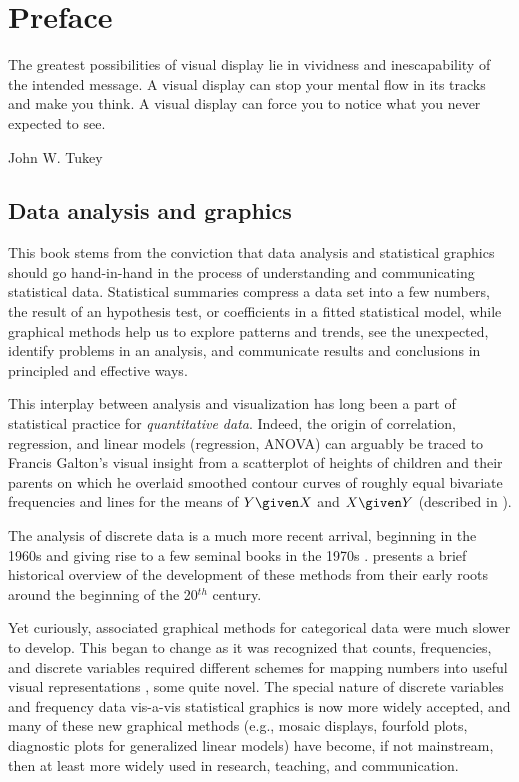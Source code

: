 \chapter*{Preface}


\epigraph{The greatest possibilities of visual display lie in vividness and inescapability of the intended message.
A visual display can stop your mental flow in its tracks and make you think.
A visual display can force you to notice what you never expected to see.}{John W. Tukey \citeyearpar{Tukey:90}}



\section*{Data analysis and graphics}

This book stems from the conviction that data analysis and statistical graphics should
go hand-in-hand in the process of understanding and communicating statistical data.
Statistical summaries compress a data set into a few numbers, the result of an
hypothesis test, or coefficients in a fitted statistical model,
while graphical methods help us to explore patterns and trends, see the unexpected,
identify problems in an analysis, and communicate results and conclusions in 
principled and effective ways. 

This interplay between analysis and visualization has long been a part of 
statistical practice for \emph{quantitative data}.  Indeed, the origin
of correlation, regression, and linear models (regression, ANOVA) can
arguably be traced to Francis Galton's \citeyearpar{Galton:1886}
visual insight from a scatterplot of heights of children and their parents
on which he overlaid smoothed contour curves of roughly equal bivariate frequencies
and lines for the means of $Y \given X$ and $X \given Y$
(described in \citet{FriendlyDenis:05:scat,Friendly-etal:ellipses:2013}).

The analysis of discrete data is a much more recent arrival, beginning in the
1960s and giving rise to a few seminal books in the 1970s
\citep{Bishop-etal:75,Haberman:74, Goodman:1978,Fienberg:80}.
\citet[]{Agresti:2013} presents a brief historical overview of the
development of these methods from their early roots around the beginning
of the 20$^{th}$ century.

Yet curiously, associated graphical methods for categorical data were 
much slower to develop. This began to change as it was recognized that
counts, frequencies, and discrete variables required different
schemes for mapping numbers into useful visual representations \citep{Friendly:95,Friendly:97},
some quite novel.
The special nature of discrete variables
and frequency data vis-a-vis statistical graphics is now more widely accepted,
and many of these new graphical methods (e.g., mosaic displays, fourfold plots, diagnostic
plots for generalized linear models) have become, if not mainstream, then at
least more widely used in research, teaching, and communication.

